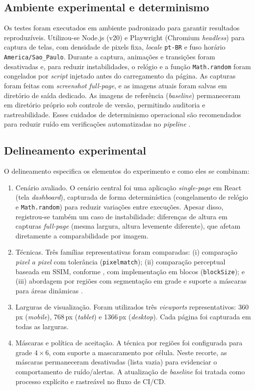 \documentclass{UNESC}
\begin{document}
\subsection{Ambiente experimental e determinismo}
Os testes foram executados em ambiente padronizado para garantir resultados reproduzíveis. Utilizou-se Node.js (v20) e Playwright (Chromium \emph{headless}) para captura de telas, com densidade de pixels fixa, \emph{locale} \texttt{pt-BR} e fuso horário \texttt{America/Sao\_Paulo}. Durante a captura, animações e transições foram desativadas e, para reduzir instabilidades, o relógio e a função \texttt{Math.random} foram congelados por \emph{script} injetado antes do carregamento da página. As capturas foram feitas com \emph{screenshot} \emph{full-page}, e as imagens atuais foram salvas em diretório de saída dedicado. As imagens de referência (\emph{baseline}) permaneceram em diretório próprio sob controle de versão, permitindo auditoria e rastreabilidade. Esses cuidados de determinismo operacional são recomendados para reduzir ruído em verificações automatizadas no \emph{pipeline} \cite{heinonen2020}.

\subsection{Delineamento experimental}
O delineamento especifica os elementos do experimento e como eles se combinam:
\begin{enumerate}[label=\alph*),leftmargin=1.5em]
  \item Cenário avaliado. O cenário central foi uma aplicação \emph{single-page} em React (tela \textit{dashboard}), capturada de forma determinística (congelamento de relógio e \texttt{Math.random}) para reduzir variações entre execuções. Apesar disso, registrou-se também um caso de instabilidade: diferenças de altura em capturas \emph{full-page} (mesma largura, altura levemente diferente), que afetam diretamente a comparabilidade por imagem.
  \item Técnicas. Três famílias representativas foram comparadas: (i) comparação \emph{pixel a pixel} com tolerância (\texttt{pixelmatch}); (ii) comparação perceptual baseada em SSIM, conforme , com implementação em blocos (\texttt{blockSize}); e (iii) abordagem por regiões com segmentação em grade e suporte a máscaras para áreas dinâmicas \cite{tanno2020}.
  \item Larguras de visualização. Foram utilizados três \emph{viewports} representativos: 360\,px (\textit{mobile}), 768\,px (\textit{tablet}) e 1366\,px (\textit{desktop}). Cada página foi capturada em todas as larguras.
  \item Máscaras e política de aceitação. A técnica por regiões foi configurada para grade 4\,$\times$\,6, com suporte a mascaramento por célula. Neste recorte, as máscaras permaneceram desativadas (lista vazia) para evidenciar o comportamento de ruído/alertas. A atualização de \emph{baseline} foi tratada como processo explícito e rastreável no fluxo de CI/CD.
\end{enumerate}
\end{document}
